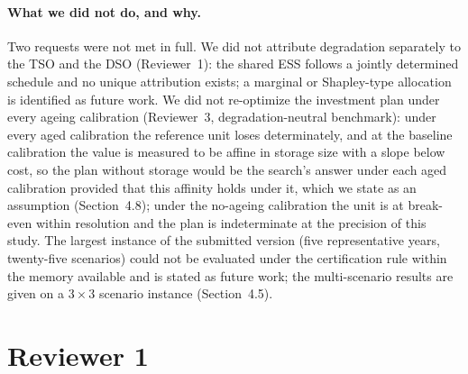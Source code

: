 \documentclass[11pt]{article}
\begin{document}
\paragraph{What we did not do, and why.}
Two requests were not met in full. We did not attribute degradation separately to the TSO and the DSO (Reviewer~1): the shared ESS follows a jointly determined schedule and no unique attribution exists; a marginal or Shapley-type allocation is identified as future work. We did not re-optimize the investment plan under every ageing calibration (Reviewer~3, degradation-neutral benchmark): under every aged calibration the reference unit loses determinately, and at the baseline calibration the value is measured to be affine in storage size with a slope below cost, so the plan without storage would be the search's answer under each aged calibration provided that this affinity holds under it, which we state as an assumption (Section~4.8); under the no-ageing calibration the unit is at break-even within resolution and the plan is indeterminate at the precision of this study. The largest instance of the submitted version (five representative years, twenty-five scenarios) could not be evaluated under the certification rule within the memory available and is stated as future work; the multi-scenario results are given on a $3\times3$ scenario instance (Section~4.5).

\section*{Reviewer 1}
\end{document}
